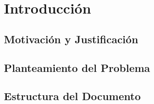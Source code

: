 \chapter{Introducción}\label{ch:introduccion}

\section{Motivación y Justificación}

\section{Planteamiento del Problema}

\section{Estructura del Documento}
